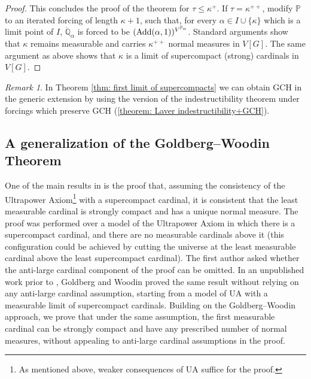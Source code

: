 \documentclass[11pt]{amsart}
\theoremstyle{definition}
\theoremstyle{remark}
\newtheorem{remark}[theorem]{Remark}
\newcommand\<{{<}}
\newcommand{\po}{\mathbb{P}}
\newcommand{\qo}{\mathbb{Q}}
\begin{document}
\begin{proof}
    This concludes the proof of the theorem for $\tau\leq \kappa^+$. If $\tau = \kappa^{++}$, modify $\po$ to an iterated forcing of length $\kappa+1$, such that, for every $\alpha\in I\cup \{\kappa\}$ which is a limit point of $I$, $\dot{\qo}_\alpha$ is forced to be $({\rm{Add}}(\alpha,1))^{V^{\po_\alpha}}$. Standard arguments show that $\kappa$ remains measurable and carries $\kappa^{++}$ normal measures in $V[G]$. The same argument as above shows that $\kappa$ is a limit of supercompact (strong) cardinals in $V[G]$.
\end{proof} 



\begin{remark}\label{Remark: adding GCH to the theorem about measurable limit of supercompacts}
    In Theorem \ref{thm: first limit of supercompacts} we can obtain GCH in the generic extension by using the version of the indestructibility theorem under forcings which preserve GCH (\ref{theorem: Laver indestructibility+GCH}).
\end{remark}

\subsection{A generalization of the Goldberg--Woodin Theorem}

One of the main results in \cite{GitikKaplan} is the proof that, assuming the consistency of the Ultrapower Axiom\footnote{As mentioned above, weaker consequences of UA suffice for the proof.} with a supercompact cardinal, it is consistent that the least measurable cardinal is strongly compact and has a unique normal measure. The proof was performed over a model of the Ultrapower Axiom in which there is a supercompact cardinal, and there are no measurable cardinals above it (this configuration could be achieved by cutting the universe at the least measurable cardinal above the least supercompact cardinal). The first author asked whether the anti-large cardinal component of the proof can be omitted. In an unpublished work prior to \cite{GitikKaplan}, Goldberg and Woodin proved  the same result without relying on any anti-large cardinal assumption, starting from a model of UA with a  measurable limit of supercompact cardinals. Building on the Goldberg--Woodin approach, we prove that under the same assumption, the first measurable cardinal can be strongly compact and have any prescribed number of normal measures, without appealing to anti-large cardinal assumptions in the proof.
\end{document}
